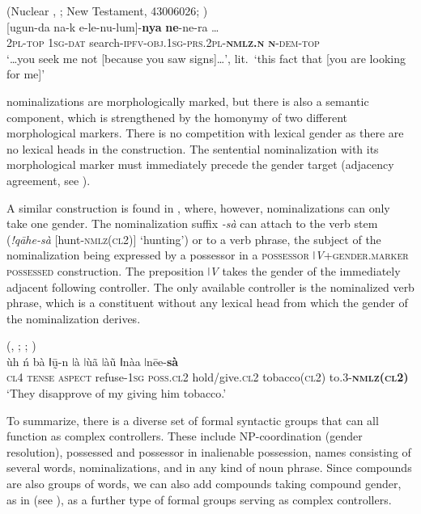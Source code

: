 \documentclass[output=collectionpaper]{langsci/langscibook}
\begin{document}
\ea\label{ex:WDG:58}
 (Nuclear , ; New Testament, 43006026; \citealt[80]{Waelchli2018})\\
\gll {{\dots}} [ugun-da	na-k	e-le-nu-lum]-\textbf{nya}	\textbf{ne}-ne-ra {{\dots}}\\
{} \textsc{2pl-top}	\textsc{1sg-dat}	search-\textsc{ipfv-obj.1sg-prs.2pl-\textbf{nmlz.n}}	\textsc{\textbf{n}-dem-top} {}\\
\glt `{\dots}you seek me not [because you saw signs]{\dots}', lit.\ `this fact that [you are looking for me]' \\
\z

 nominalizations are morphologically marked, but there is also a semantic component, which is strengthened by the homonymy of two different morphological markers. There is no competition with lexical gender as there are no lexical heads in the construction. The sentential nominalization with its morphological marker must immediately precede the gender target (adjacency agreement, see ).

A similar construction is found in , where, however, nominalizations can only take one gender. The nominalization suffix \textit{-sà} can attach to the verb stem (\textit{!qāhe-sà} [hunt-\textsc{nmlz(cl2)}] `hunting') or to a verb phrase, the subject of the nominalization being expressed by a possessor in a \textsc{possessor }\textit{ǀV}+\textsc{gender.marker possessed} construction. The preposition \textit{ǀV} takes the gender of the immediately adjacent following controller. The only available controller is the nominalized verb phrase, which is a constituent without any lexical head from which the gender of the nominalization derives.

\ea\label{ex:WDG:59}
 (, ; \citealt[30]{Traill1994}; \citealt[7]{Gueldemann2004})\\
\gll ùh	ń	bà	ǁṵ̄-n	ǀà	ǀùã	{ǀàũ ǁnàa}	ǀnēe-\textbf{sà}\\
\textsc{cl4}	\textsc{tense}	\textsc{aspect}	refuse-\textsc{1sg}	\textsc{poss.cl2}	hold/give.\textsc{cl2}	tobacco(\textsc{cl2})	to.3-\textbf{\textsc{nmlz(cl2)}}\\
\glt `They disapprove of my giving him tobacco.'\\
\z

To summarize, there is a diverse set of formal syntactic groups that can all function as complex controllers. These include NP-coordination (gender resolution), possessed and possessor in inalienable possession, names consisting of several words, nominalizations, and \textendash{} in  \textendash{} any kind of noun phrase. Since compounds are also groups of words, we can also add compounds taking compound gender, as in  (see ), as a further type of formal groups serving as complex controllers.
\end{document}
